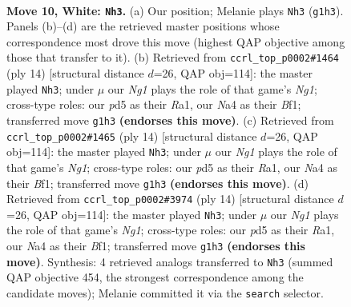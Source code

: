 \documentclass[11pt]{article}
\begin{document}
\clearpage

\begin{figure}[p]\centering
\begin{subfigure}{0.46\textwidth}\centering
\resizebox{\linewidth}{!}{%
\newchessgame
\chessboard[
  setfen={rnb1k2r/pppn1p2/4p3/3pP1qp/N2P4/8/PPP3PP/R2QKBNR w KQkq - 0 10},
  showmover=false,
  pgfstyle=straightmove, color=movearrow, markmove={g1-h3}
]}
\caption{}
\end{subfigure}\hfill
\begin{subfigure}{0.46\textwidth}\centering
\resizebox{\linewidth}{!}{%
\newchessgame
\chessboard[
  setfen={rnb1k2r/pppn1ppp/4p3/3pP1q1/3P4/2N5/PPP2PP1/R2QKBNR w KQkq - 0 8},
  showmover=false,
  pgfstyle=straightmove, color=movearrow, markmove={g1-h3}
]}
\caption{}
\end{subfigure}
\\[4pt]
\begin{subfigure}{0.46\textwidth}\centering
\resizebox{\linewidth}{!}{%
\newchessgame
\chessboard[
  setfen={rnb1k2r/pppn1ppp/4p3/3pP1q1/3P4/2N5/PPP2PP1/R2QKBNR w KQkq - 0 8},
  showmover=false,
  pgfstyle=straightmove, color=movearrow, markmove={g1-h3}
]}
\caption{}
\end{subfigure}\hfill
\begin{subfigure}{0.46\textwidth}\centering
\resizebox{\linewidth}{!}{%
\newchessgame
\chessboard[
  setfen={rnb1k2r/pppn1ppp/4p3/3pP1q1/3P4/2N5/PPP2PP1/R2QKBNR w KQkq - 0 8},
  showmover=false,
  pgfstyle=straightmove, color=movearrow, markmove={g1-h3}
]}
\caption{}
\end{subfigure}
\caption{\textbf{Move 10, White: \texttt{Nh3}.} (a) Our position; Melanie plays \texttt{Nh3} (\texttt{g1h3}). Panels (b)--(d) are the retrieved master positions whose correspondence most drove this move (highest QAP objective among those that transfer to it). (b) Retrieved from \texttt{ccrl\_top\_p0002\#1464} (ply 14) [structural distance $d$=26, QAP obj=114]: the master played \texttt{Nh3}; under $\mu$ our \emph{Ng1} plays the role of that game's \emph{Ng1}; cross-type roles: our \emph{p}d5 as their \emph{R}a1, our \emph{N}a4 as their \emph{B}f1; transferred move \texttt{g1h3} \textbf{(endorses this move)}. (c) Retrieved from \texttt{ccrl\_top\_p0002\#1465} (ply 14) [structural distance $d$=26, QAP obj=114]: the master played \texttt{Nh3}; under $\mu$ our \emph{Ng1} plays the role of that game's \emph{Ng1}; cross-type roles: our \emph{p}d5 as their \emph{R}a1, our \emph{N}a4 as their \emph{B}f1; transferred move \texttt{g1h3} \textbf{(endorses this move)}. (d) Retrieved from \texttt{ccrl\_top\_p0002\#3974} (ply 14) [structural distance $d$=26, QAP obj=114]: the master played \texttt{Nh3}; under $\mu$ our \emph{Ng1} plays the role of that game's \emph{Ng1}; cross-type roles: our \emph{p}d5 as their \emph{R}a1, our \emph{N}a4 as their \emph{B}f1; transferred move \texttt{g1h3} \textbf{(endorses this move)}. Synthesis: 4 retrieved analogs transferred to \texttt{Nh3} (summed QAP objective 454, the strongest correspondence among the candidate moves); Melanie committed it via the \texttt{search} selector.}
\label{fig:thought-m18}
\end{figure}
\end{document}
